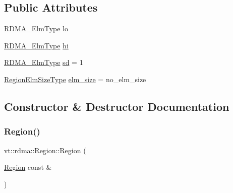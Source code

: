 \subsection*{Public Attributes}
\begin{DoxyCompactItemize}
\item 
\hyperlink{namespacevt_a2c2a902092b72056f70210c159f966f0}{R\+D\+M\+A\+\_\+\+Elm\+Type} \hyperlink{structvt_1_1rdma_1_1_region_af2308f5160a4900ab6597d11fc2e51df}{lo}
\item 
\hyperlink{namespacevt_a2c2a902092b72056f70210c159f966f0}{R\+D\+M\+A\+\_\+\+Elm\+Type} \hyperlink{structvt_1_1rdma_1_1_region_a59ead9e316796250e28c58574d3d256f}{hi}
\item 
\hyperlink{namespacevt_a2c2a902092b72056f70210c159f966f0}{R\+D\+M\+A\+\_\+\+Elm\+Type} \hyperlink{structvt_1_1rdma_1_1_region_a9e6e05b4c6584c1a7b4c5b527f229f27}{sd} = 1
\item 
\hyperlink{namespacevt_1_1rdma_ac07ef96e399913495fde1da0f83f684c}{Region\+Elm\+Size\+Type} \hyperlink{structvt_1_1rdma_1_1_region_aec2a61388d8aadf79dbf3087a3e0af10}{elm\+\_\+size} = no\+\_\+elm\+\_\+size
\end{DoxyCompactItemize}


\subsection{Constructor \& Destructor Documentation}
\mbox{\label{structvt_1_1rdma_1_1_region_a11155d9c0ffeb8c27adec32b609feb48}} 
\subsubsection{\texorpdfstring{Region()}{Region()}\hspace{0.1cm}{\footnotesize\ttfamily [1/2]}}
{\footnotesize\ttfamily vt\+::rdma\+::\+Region\+::\+Region (\begin{DoxyParamCaption}\item[{\hyperlink{structvt_1_1rdma_1_1_region}{Region} const \&}]{ }\end{DoxyParamCaption})\hspace{0.3cm}{\ttfamily [default]}}

\mbox{\label{structvt_1_1rdma_1_1_region_ad8ff4d0e314b0b0986fa8e0c23a0543b}} 
